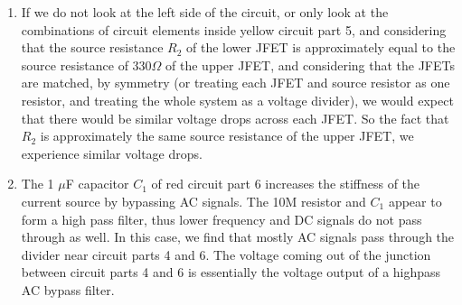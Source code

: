 \documentclass{article}
\begin{document}
\begin{enumerate}
        \item If we do not look at the left side of the circuit, or only look at the combinations of circuit elements inside yellow circuit part 5, and considering that the source resistance $R_2$ of the lower JFET is approximately equal to the source resistance of 330$\Omega$ of the upper JFET, and considering that the JFETs are matched, by symmetry (or treating each JFET and source resistor as one resistor, and treating the whole system as a voltage divider), we would expect that there would be similar voltage drops across each JFET. So the fact that $R_2$ is approximately the same source resistance of the upper JFET, we experience similar voltage drops.
        \item The 1 $\mu$F capacitor $C_1$ of red circuit part 6 increases the stiffness of the current source by bypassing AC signals. The 10M resistor and $C_1$ appear to form a high pass filter, thus lower frequency and DC signals do not pass through as well. In this case, we find that mostly AC signals pass through the divider near circuit parts 4 and 6. The voltage coming out of the junction between circuit parts 4 and 6 is essentially the voltage output of a highpass AC bypass filter.
    \end{enumerate}
\end{document}
